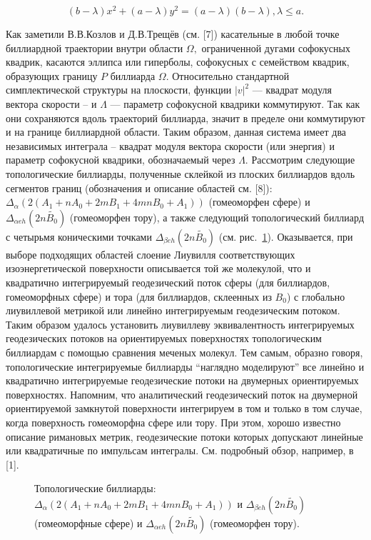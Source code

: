 $$ (b-\lambda)x^2+(a-\lambda)y^2=(a-\lambda)(b-\lambda),   \lambda\leqslant a.$$


Как заметили В.В.Козлов и Д.В.Трещёв (см. [7]) касательные в любой точке биллиардной траектории внутри области $\Omega,$ ограниченной дугами софокусных квадрик,
касаются эллипса или гиперболы, софокусных с семейством квадрик, образующих границу $P$ биллиарда $\Omega$.
Относительно стандартной симплектической структуры на плоскости, функции $|v|^2$ --- квадрат модуля вектора скорости -- и $\Lambda$ --- параметр софокусной квадрики
коммутируют. Так как они сохраняются вдоль траекторий биллиарда, значит в пределе они коммутируют и на границе биллиардной области.
 Таким
образом, данная   система имеет два независимых   интеграла  --   квадрат модуля вектора скорости (или энергия) и параметр софокусной квадрики, обозначаемый через $\Lambda.$
Рассмотрим следующие топологические биллиарды, полученные склейкой из плоских биллиардов вдоль сегментов границ (обозначения и описание областей см. [8]): $\Delta_\alpha(2(A_1+nA_0+2mB_1+4mnB_0+A_1)) $ (гомеоморфен сфере)
и
  $\Delta_{\alpha eh}(2n \widetilde{B_0}) $ (гомеоморфен тору), а  также следующий топологический биллиард с четырьмя коническими точками $\Delta_{\beta eh}(2n \widetilde{B_0})  $ (см. рис.~\ref{topologicalbilliards}). Оказывается, при выборе подходящих областей слоение Лиувилля соответствующих изоэнергетической поверхности описывается той же молекулой, что и квадратично интегрируемый геодезический поток   сферы (для биллиардов, гомеоморфных сфере) и тора (для биллиардов, склеенных из $B_0$) с глобально лиувиллевой метрикой или линейно интегрируемым геодезическим потоком.  Таким образом удалось установить лиувиллеву эквивалентность    интегрируемых геодезических потоков на ориентируемых поверхностях топологическим  биллиардам  с помощью сравнения меченых молекул. Тем самым, образно говоря, топологические  интегрируемые биллиарды ``наглядно моделируют''  все линейно и квадратично интегрируемые геодезические потоки на двумерных  ориентируемых поверхностях. Напомним, что аналитический геодезический поток на двумерной ориентируемой замкнутой поверхности интегрируем в том и только в том случае, когда поверхность гомеоморфна сфере или тору.  При этом, хорошо известно описание римановых метрик, геодезические потоки которых допускают линейные или квадратичные по импульсам интегралы. См. подробный обзор, например, в [1].





  \begin{figure}[h!]


  \caption{Топологические биллиарды:  $\Delta_\alpha(2(A_1+nA_0+2mB_1+4mnB_0+A_1))  $ и $\Delta_{\beta eh}(2n \widetilde{B_0})  $ (гомеоморфные сфере)
и
  $\Delta_{\alpha eh}(2n \widetilde{B_0}) $ (гомеоморфен тору). }\label{topologicalbilliards}
\end{figure}

